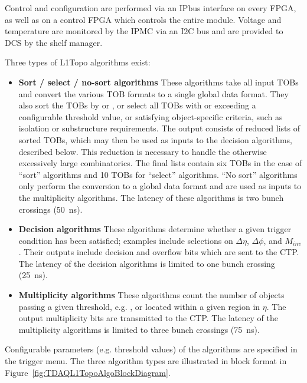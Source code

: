 \documentclass[cernpreprint, atlasdraft=false, UKenglish,british,orcidlogo, texmf, orcidlogo]{atlasdoc}
\begin{document}
Control and configuration are performed via an IPbus interface on every \gls{FPGA}, as well as on a control \gls{FPGA} which controls the entire module.  Voltage and temperature are monitored by the \gls{IPMC} via an \gls{I2C} bus and are provided to \gls{DCS} by the shelf manager.
 
Three types of \gls{L1Topo} algorithms exist:
\begin{itemize}
\item \textbf{Sort / select / no-sort algorithms} These algorithms take all input \glspl{TOB} and convert the various \gls{TOB} formats to a single global data format.  They also sort the \glspl{TOB} by \ET or \pT,  or select all \glspl{TOB} with \ET or \pT exceeding a configurable threshold value, or satisfying object-specific criteria, such as isolation or substructure requirements.  The output consists of reduced lists of sorted \glspl{TOB}, which may then be used as inputs to the decision algorithms, described below.  This reduction is necessary to handle the otherwise excessively large combinatorics.  The final lists contain six \glspl{TOB} in the case of ``sort'' algorithms and 10 \glspl{TOB} for ``select'' algorithms.  ``No sort'' algorithms only perform the conversion to a global data format and are used as inputs to the multiplicity algorithms.  The latency of these algorithms is two bunch crossings (\SI{50}{\ns}).
\item \textbf{Decision algorithms} These algorithms determine whether a given trigger condition has been satisfied; examples include selections on $\Delta\eta$, $\Delta\phi$, and $M_{inv}$.  Their outputs include decision and overflow bits which are sent to the \gls{CTP}.  The latency of the decision algorithms is limited to one bunch crossing (\SI{25}{\ns}).
\item \textbf{Multiplicity algorithms} These algorithms count the number of objects passing a given threshold, e.g. \ET, or located within a given region in $\eta$.  The output multiplicity bits are transmitted to the \gls{CTP}.  The latency of the multiplicity algorithms is limited to three bunch crossings (\SI{75}{\ns}).
\end{itemize}
Configurable parameters (e.g. threshold values) of the algorithms are specified in the trigger menu.  The three algorithm types are illustrated in block format in Figure~\ref{fig:TDAQL1TopoAlgoBlockDiagram}.
 
\end{document}
